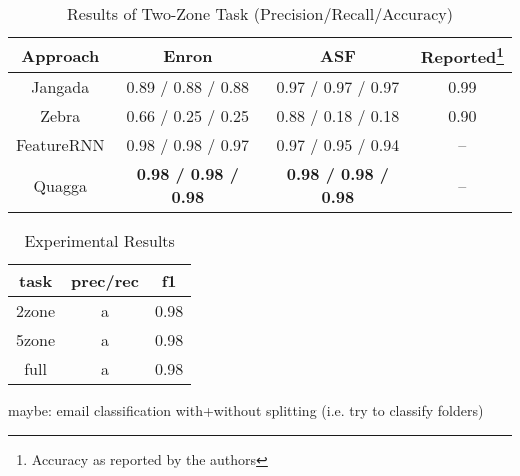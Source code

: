 \documentclass{llncs}
\begin{document}

\begin{table}
	\centering
	\caption{Results of Two-Zone Task (Precision/Recall/Accuracy)}
	\label{tab:results-comp}
	\begin{tabular*}{0.9\textwidth}{@{\extracolsep{\fill}}cccc}
		\toprule
		Approach & Enron & ASF & Reported\footnote{Accuracy as reported by the authors}\\ \midrule
		Jangada\cite{signature} & 0.89 / 0.88 / 0.88 & 0.97 / 0.97 / 0.97 & 0.99 \\
		Zebra\cite{zones}       & 0.66 / 0.25 / 0.25 & 0.88 / 0.18 / 0.18 & 0.90 \\
		FeatureRNN              & 0.98 / 0.98 / 0.97 & 0.97 / 0.95 / 0.94 & --   \\
		Quagga                  & \textbf{0.98 / 0.98 / 0.98} & \textbf{0.98 / 0.98 / 0.98} & --   \\
		\bottomrule	
	\end{tabular*}
\end{table}

\begin{table}
	\centering
	\caption{Experimental Results}
	\label{tab:results}
	\begin{tabular}{|c|cc|}
		\hline
		task & prec/rec& f1\\ \hline
		2zone& a & 0.98\\
		5zone& a & 0.98\\
		full& a & 0.98\\
		\hline	
	\end{tabular}
\end{table}



maybe: email classification with+without splitting (i.e. try to classify folders)
\end{document}
